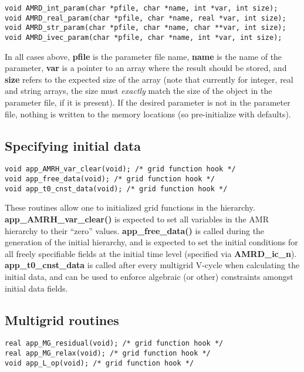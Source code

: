 \documentclass[aps,amssymb,unsortedaddress,nofootinbib]{revtex4}
\begin{document}
\begin{verbatim}
void AMRD_int_param(char *pfile, char *name, int *var, int size);
void AMRD_real_param(char *pfile, char *name, real *var, int size);
void AMRD_str_param(char *pfile, char *name, char **var, int size);
void AMRD_ivec_param(char *pfile, char *name, int *var, int size);
\end{verbatim}

In all cases above, {\bf pfile} is the parameter file name,
{\bf name} is the name of the parameter, {\bf var} is a pointer
to an array where the result should be stored, and {\bf size}
refers to the expected size of the array (note that currently
for integer, real and string arrays, the size must {\em exactly}
match the size of the object in the parameter file, if it is present). If the desired
parameter is not in the parameter file, nothing is written to the
memory locations (so pre-initialize with defaults).

\subsection{Specifying initial data}

\begin{verbatim}
void app_AMRH_var_clear(void); /* grid function hook */
void app_free_data(void); /* grid function hook */
void app_t0_cnst_data(void); /* grid function hook */
\end{verbatim}

These routines allow one to initialized grid functions in the hierarchy.
{\bf app\_AMRH\_var\_clear()} is expected to set all variables
in the AMR hierarchy to their ``zero'' values. {\bf app\_free\_data()}
is called during the generation of the initial hierarchy, and
is expected to set the initial conditions for all freely specifiable
fields at the initial time level (specified via {\bf AMRD\_ic\_n}). 
{\bf app\_t0\_cnst\_data} is called after every multigrid V-cycle
when calculating the initial data, and can be used to enforce
algebraic (or other) constraints amongst initial data fields.

\subsection{Multigrid routines} \label{sec_MG_routines}

\begin{verbatim}
real app_MG_residual(void); /* grid function hook */
real app_MG_relax(void); /* grid function hook */
void app_L_op(void); /* grid function hook */
\end{verbatim}
\end{document}
